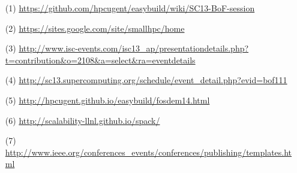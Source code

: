 \documentclass[a4paper,10pt]{article}
\begin{document}
\begin{itemize} 
    \item[(1)] \url{https://github.com/hpcugent/easybuild/wiki/SC13-BoF-session}
    \item[(2)] \url{https://sites.google.com/site/smallhpc/home}
    \item[(3)] \url{http://www.isc-events.com/isc13_ap/presentationdetails.php?t=contribution&o=2108&a=select&ra=eventdetails}
    \item[(4)] \url{http://sc13.supercomputing.org/schedule/event_detail.php?evid=bof111}
    \item[(5)] \url{http://hpcugent.github.io/easybuild/fosdem14.html}  
    \item[(6)] \url{http://scalability-llnl.github.io/spack/}  
    \item[(7)] \url{http://www.ieee.org/conferences_events/conferences/publishing/templates.html}   
\end{itemize}
\end{document}
